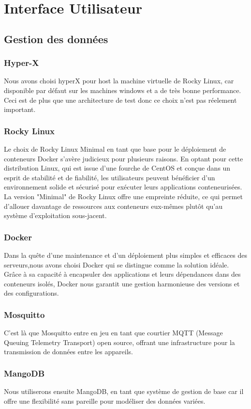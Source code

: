 \chapter{Interface Utilisateur}
\section{Gestion des données}
\subsection{Hyper-X}
Nous avons choisi hyperX pour host la machine virtuelle de Rocky Linux, car disponible par défaut sur les machines windows et a de très bonne performance. Ceci est de plus que une architecture de test donc ce choix n'est pas réelement important.
\subsection{Rocky Linux}
Le choix de Rocky Linux Minimal en tant que base pour le déploiement de conteneurs Docker s'avère judicieux pour plusieurs raisons. En optant pour cette distribution Linux, qui est issue d'une fourche de CentOS et conçue dans un esprit de stabilité et de fiabilité, les utilisateurs peuvent bénéficier d'un environnement solide et sécurisé pour exécuter leurs applications conteneurisées. La version "Minimal" de Rocky Linux offre une empreinte réduite, ce qui permet d'allouer davantage de ressources aux conteneurs eux-mêmes plutôt qu'au système d'exploitation sous-jacent.
\subsection{Docker}
Dans la quête d'une maintenance et d'un déploiement plus simples et efficaces des serveurs,nous avons choisi Docker qui se distingue comme la solution idéale. Grâce à sa capacité à encapsuler des applications et leurs dépendances dans des conteneurs isolés, Docker nous garantit une gestion harmonieuse des versions et des configurations.
\subsection{Mosquitto}
C'est là que Mosquitto entre en jeu en tant que courtier MQTT (Message Queuing Telemetry Transport) open source, offrant une infrastructure pour la transmission de données entre les appareils.
\subsection{MangoDB}
Nous utiliserons ensuite MangoDB, en tant que système de gestion de base car il offre une flexibilité sans pareille pour modéliser des données variées.
